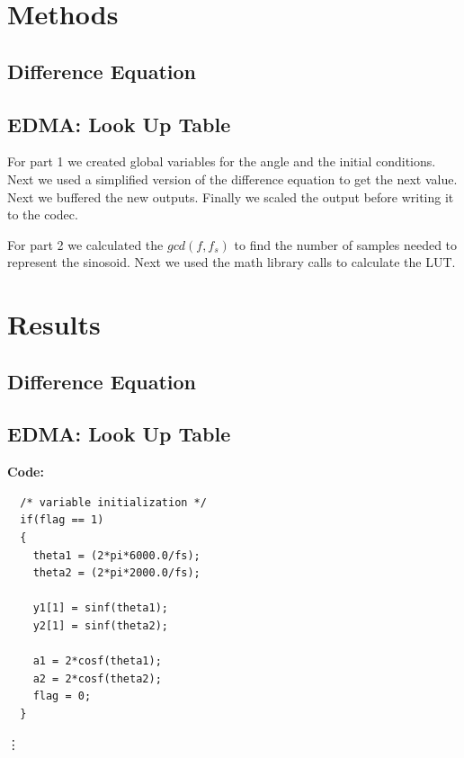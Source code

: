 \documentclass{article}
\begin{document}
\section{Methods}

\subsection{Difference Equation}
\subsection{EDMA: Look Up Table}

For part 1 we created global variables for the angle and the initial conditions. Next we used a simplified version of the difference equation to get the next value. Next we buffered the new outputs. Finally we scaled the output before writing it to the codec.

For part 2 we calculated the $gcd(f, f_s)$ to find the number of samples needed to represent the sinosoid. Next we used the math library calls to calculate the LUT.
 

\section{Results}

\subsection{Difference Equation}
\subsection{EDMA: Look Up Table}

\textbf{Code:}

\begin{verbatim}
  /* variable initialization */
  if(flag == 1)
  {
    theta1 = (2*pi*6000.0/fs);
    theta2 = (2*pi*2000.0/fs);

    y1[1] = sinf(theta1);
    y2[1] = sinf(theta2);

    a1 = 2*cosf(theta1);
    a2 = 2*cosf(theta2);
    flag = 0;
  }
\end{verbatim}

\vdots
\end{document}
